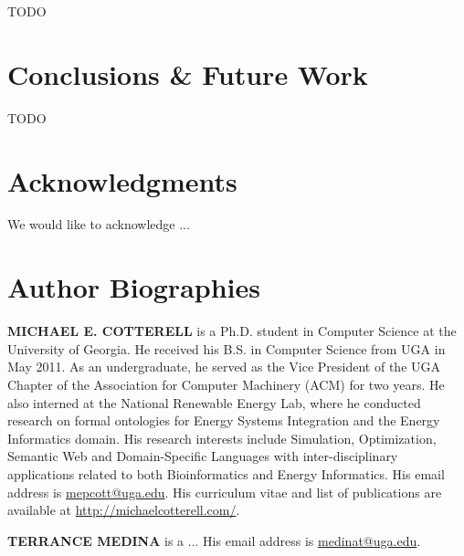 \documentclass[letterpaper,twocolumn,12pt]{article}
\begin{document}
TODO

\section{Conclusions \& Future Work}
\label{sec:conclusions}

TODO

\section*{Acknowledgments}
We would like to acknowledge ...

%

 

\section*{Author Biographies} 
\vspace{8 pt}
\noindent \textbf{MICHAEL E. COTTERELL} is a Ph.D. student in Computer Science at the University of Georgia. 
He received his B.S. in Computer Science from UGA in May 2011. 
As an undergraduate, he served as the Vice President of the UGA Chapter of the Association for Computer Machinery (ACM) for two years. 
He also interned at the National Renewable Energy Lab, where he conducted research on formal ontologies for Energy Systems Integration and the Energy Informatics domain. 
His research interests include Simulation, Optimization, Semantic Web and Domain-Specific Languages with inter-disciplinary applications related to both Bioinformatics and Energy Informatics.
His email address is \href{mailto:mepcott@uga.edu}{mepcott@uga.edu}.
His curriculum vitae and list of publications are available at \url{http://michaelcotterell.com/}.

\vspace{8 pt}
\noindent \textbf{TERRANCE MEDINA} is a ... His email address is \href{mailto:medinat@uga.edu}{medinat@uga.edu}.
\end{document}
